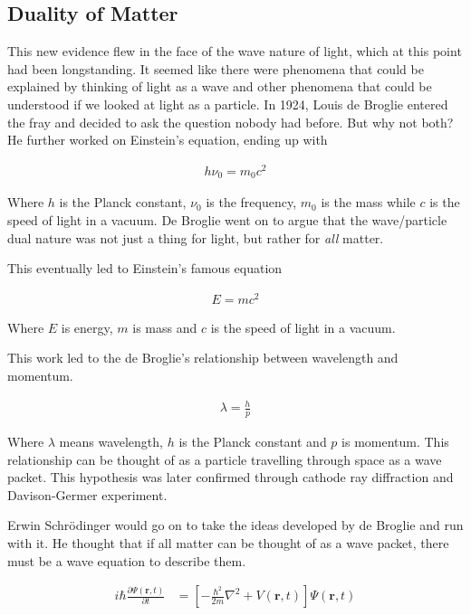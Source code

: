 \subsection{Duality of Matter}This new evidence flew in the face of the wave nature of light, which at this point had been longstanding.
It seemed like there were phenomena that could be explained by thinking of light as a wave and other phenomena that could be understood if we looked at light as a particle.
In 1924, Louis de Broglie entered the fray and decided to ask the question nobody had before.
But why not both?
He further worked on Einstein's equation, ending up with

\begin{align}
  h \nu_0 = m_0 c^2
\end{align}

Where $h$ is the Planck constant, $\nu_0$ is the frequency, $m_0$ is the mass while $c$ is the speed of light in a vacuum.
De Broglie went on to argue that the wave/particle dual nature was not just a thing for light, but rather for \textit{all} matter\cite{DeBroglie_1925}. 

This eventually led to Einstein's famous equation

\begin{align}
  E = m c^2
\end{align}

Where $E$ is energy, $m$ is mass and $c$ is the speed of light in a vacuum\cite{Einstein_1905a}.

This work led to the de Broglie's relationship between wavelength and momentum.

\begin{align}
  \lambda = \frac{h}{p}  
\end{align}

Where $\lambda$ means wavelength, $h$ is the Planck constant and $p$ is momentum.
This relationship can be thought of as a particle travelling through space as a wave packet\cite{DeBroglie_1925}.
This hypothesis was later confirmed through cathode ray diffraction and Davison-Germer experiment\cite{Davisson_Germer_1927}\cite{Davisson_Germer_1927a}\cite{Davisson_Germer_1928}.

Erwin Schrödinger would go on to take the ideas developed by de Broglie and run with it.
He thought that if all matter can be thought of as a wave packet, there must be a wave equation to describe them.


\begin{align}
  i \hbar \frac{\partial \Psi(\mathbf{r}, t)}{\partial t} &= \left[ -\frac{\hbar^2}{2m} \nabla^2 + V(\mathbf{r}, t) \right] \Psi(\mathbf{r}, t) 
\end{align}

